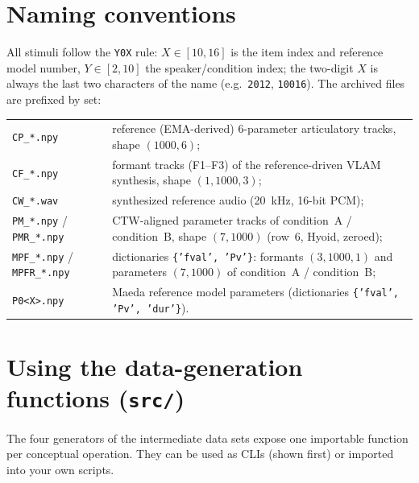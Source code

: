 \documentclass[11pt,a4paper]{article}
\begin{document}
\section{Naming conventions}
All stimuli follow the \texttt{Y0X} rule: $X \in [10,16]$ is the item
index and reference model number, $Y \in [2,10]$ the speaker/condition
index; the two-digit $X$ is always the last two characters of the name
(e.g.\ \texttt{2012}, \texttt{10016}). The archived files are prefixed by
set:
\begin{longtable}{p{4.6cm}p{10.5cm}}
\texttt{CP\_*.npy} & reference (EMA-derived) 6-parameter articulatory tracks, shape $(1000, 6)$;\\
\texttt{CF\_*.npy} & formant tracks (F1--F3) of the reference-driven VLAM synthesis, shape $(1, 1000, 3)$;\\
\texttt{CW\_*.wav} & synthesized reference audio (20~kHz, 16-bit PCM);\\
\texttt{PM\_*.npy} / \texttt{PMR\_*.npy} & CTW-aligned parameter tracks of condition~A / condition~B, shape $(7, 1000)$ (row~6, Hyoid, zeroed);\\
\texttt{MPF\_*.npy} / \texttt{MPFR\_*.npy} & dictionaries \texttt{\{'fval', 'Pv'\}}: formants $(3, 1000, 1)$ and parameters $(7, 1000)$ of condition~A / condition~B;\\
\texttt{P0<X>.npy} & Maeda reference model parameters (dictionaries \texttt{\{'fval', 'Pv', 'dur'\}}).
\end{longtable}

\section{Using the data-generation functions (\texttt{src/})}
The four generators of the intermediate data sets expose one importable
function per conceptual operation. They can be used as CLIs (shown first)
or imported into your own scripts.
\end{document}
